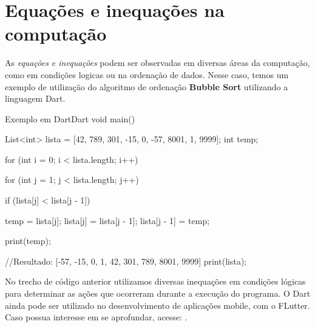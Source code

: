 \section{Equações e inequações na computação}

As \emph{equações e inequações} podem ser observadas em diversas áreas da computação, como em condições logicas ou na ordenação de dados. Nesse caso, temos um exemplo de utilização do algoritmo de ordenação \textbf{Bubble Sort} utilizando a linguagem Dart.\\

\begin{codesnip}{Exemplo em Dart}{Dart}
void main() {
    List<int> lista = [42, 789, 301, -15, 0, -57, 8001, 1, 9999];
    int temp;
    
    for (int i = 0; i < lista.length; i++) {
        for (int j = 1; j < lista.length; j++) {
            if (lista[j] < lista[j - 1]) {
                temp = lista[j];
                lista[j] = lista[j - 1];
                lista[j - 1] = temp;
                
                print(temp);
            }
        }
    }
    
    //Resultado: [-57, -15, 0, 1, 42, 301, 789, 8001, 9999]
    print(lista);
}
\end{codesnip}

No trecho de código anterior utilizamos diversas inequações em condições lógicas para determinar as ações que ocorreram durante a execução do programa. O Dart ainda pode ser utilizado no desenvolvimento de aplicações mobile, com o FLutter. Caso possua interesse em se aprofundar, acesse: . \\




